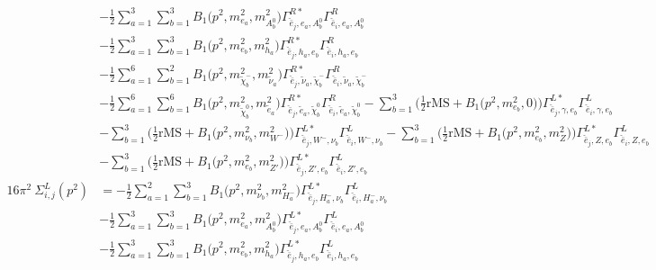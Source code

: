 \begin{itemize}
\begin{align}
 &-\frac{1}{2} \sum_{a=1}^{3}\sum_{b=1}^{3}{B_1\Big(p^{2},m^2_{e_{{a}}},m^2_{A^0_{{b}}}\Big)} {\Gamma^{R*}_{\check{\bar{e}}_{{j}},e_{{a}},A^0_{{b}}}} {\Gamma^R_{\check{\bar{e}}_{{i}},e_{{a}},A^0_{{b}}}}  \nonumber \\ 
 &-\frac{1}{2} \sum_{a=1}^{3}\sum_{b=1}^{3}{B_1\Big(p^{2},m^2_{e_{{b}}},m^2_{h_{{a}}}\Big)} {\Gamma^{R*}_{\check{\bar{e}}_{{j}},h_{{a}},e_{{b}}}} {\Gamma^R_{\check{\bar{e}}_{{i}},h_{{a}},e_{{b}}}}  \nonumber \\ 
 &-\frac{1}{2} \sum_{a=1}^{6}\sum_{b=1}^{2}{B_1\Big(p^{2},m^2_{\tilde{\chi}^-_{{b}}},m^2_{\tilde{\nu}_{{a}}}\Big)} {\Gamma^{R*}_{\check{\bar{e}}_{{j}},\tilde{\nu}_{{a}},\tilde{\chi}^-_{{b}}}} {\Gamma^R_{\check{\bar{e}}_{{i}},\tilde{\nu}_{{a}},\tilde{\chi}^-_{{b}}}}  \nonumber \\ 
 &-\frac{1}{2} \sum_{a=1}^{6}\sum_{b=1}^{6}{B_1\Big(p^{2},m^2_{\tilde{\chi}^0_{{b}}},m^2_{\tilde{e}_{{a}}}\Big)} {\Gamma^{R*}_{\check{\bar{e}}_{{j}},\tilde{e}_{{a}},\tilde{\chi}^0_{{b}}}} {\Gamma^R_{\check{\bar{e}}_{{i}},\tilde{e}_{{a}},\tilde{\chi}^0_{{b}}}}  - \sum_{b=1}^{3}\Big(\frac{1}{2} \text{rMS}  + {B_1\Big(p^{2},m^2_{e_{{b}}},0\Big)}\Big){\Gamma^{L*}_{\check{\bar{e}}_{{j}},\gamma,e_{{b}}}} {\Gamma^L_{\check{\bar{e}}_{{i}},\gamma,e_{{b}}}}  \nonumber \\ 
 &- \sum_{b=1}^{3}\Big(\frac{1}{2} \text{rMS}  + {B_1\Big(p^{2},m^2_{\nu_{{b}}},m^2_{W^-}\Big)}\Big){\Gamma^{L*}_{\check{\bar{e}}_{{j}},W^-,\nu_{{b}}}} {\Gamma^L_{\check{\bar{e}}_{{i}},W^-,\nu_{{b}}}}  - \sum_{b=1}^{3}\Big(\frac{1}{2} \text{rMS}  + {B_1\Big(p^{2},m^2_{e_{{b}}},m^2_{Z}\Big)}\Big){\Gamma^{L*}_{\check{\bar{e}}_{{j}},Z,e_{{b}}}} {\Gamma^L_{\check{\bar{e}}_{{i}},Z,e_{{b}}}}  \nonumber \\ 
 &- \sum_{b=1}^{3}\Big(\frac{1}{2} \text{rMS}  + {B_1\Big(p^{2},m^2_{e_{{b}}},m^2_{{Z'}}\Big)}\Big){\Gamma^{L*}_{\check{\bar{e}}_{{j}},{Z'},e_{{b}}}} {\Gamma^L_{\check{\bar{e}}_{{i}},{Z'},e_{{b}}}}  \\ 
16\pi^2 \ \Sigma^L_{i,j}(p^2) &= -\frac{1}{2} \sum_{a=1}^{2}\sum_{b=1}^{3}{B_1\Big(p^{2},m^2_{\nu_{{b}}},m^2_{H^-_{{a}}}\Big)} {\Gamma^{L*}_{\check{\bar{e}}_{{j}},H^-_{{a}},\nu_{{b}}}} {\Gamma^L_{\check{\bar{e}}_{{i}},H^-_{{a}},\nu_{{b}}}}  \nonumber \\ 
 &-\frac{1}{2} \sum_{a=1}^{3}\sum_{b=1}^{3}{B_1\Big(p^{2},m^2_{e_{{a}}},m^2_{A^0_{{b}}}\Big)} {\Gamma^{L*}_{\check{\bar{e}}_{{j}},e_{{a}},A^0_{{b}}}} {\Gamma^L_{\check{\bar{e}}_{{i}},e_{{a}},A^0_{{b}}}}  \nonumber \\ 
 &-\frac{1}{2} \sum_{a=1}^{3}\sum_{b=1}^{3}{B_1\Big(p^{2},m^2_{e_{{b}}},m^2_{h_{{a}}}\Big)} {\Gamma^{L*}_{\check{\bar{e}}_{{j}},h_{{a}},e_{{b}}}} {\Gamma^L_{\check{\bar{e}}_{{i}},h_{{a}},e_{{b}}}}  \nonumber \\ 

\end{align}
\end{itemize}
